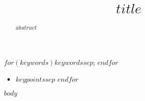 \documentclass[$paper$,$reftype$]{$documentclass$}
\title{$title$}
\begin{document}
\begin{frontmatter}
\maketitle
\begin{abstract}
$abstract$
\end{abstract}

\begin{keywords}
$for(keywords)$$keywords$$sep$; $endfor$
\end{keywords}
\end{frontmatter}

\begin{keypoints*}
\begin{itemize}
$for(keypoints)$\item{$keypoints$}$sep$
$endfor$
\end{itemize}
\end{keypoints*}

$body$

\end{document}
